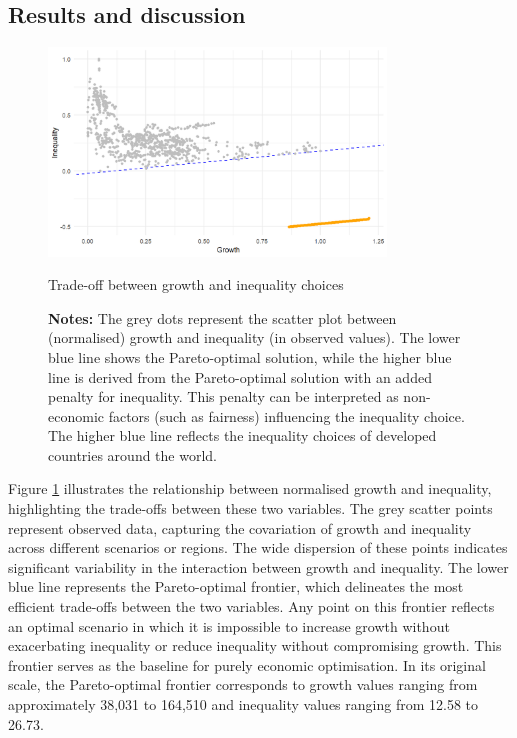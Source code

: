 \documentclass[12pt]{article}
\begin{document}
\subsection{Results and discussion}
\begin{figure}[H]
    \centering
    \includegraphics[width=0.8\textwidth]{trade_off.png}
    \caption{Trade-off between growth and inequality choices}
    \captionsetup{font=footnotesize}
    \caption*{\textbf{Notes:} The grey dots represent the scatter plot between (normalised) growth and inequality (in observed values). The lower blue line shows the Pareto-optimal solution, while the higher blue line is derived from the Pareto-optimal solution with an added penalty for inequality. This penalty can be interpreted as non-economic factors (such as fairness) influencing the inequality choice. The higher blue line reflects the inequality choices of developed countries around the world.}
    \label{fig:trade_off}
\end{figure}

Figure \ref{fig:trade_off} illustrates the relationship between normalised growth and inequality, highlighting the trade-offs between these two variables. The grey scatter points represent observed data, capturing the covariation of growth and inequality across different scenarios or regions. The wide dispersion of these points indicates significant variability in the interaction between growth and inequality. The lower blue line represents the Pareto-optimal frontier, which delineates the most efficient trade-offs between the two variables. Any point on this frontier reflects an optimal scenario in which it is impossible to increase growth without exacerbating inequality or reduce inequality without compromising growth. This frontier serves as the baseline for purely economic optimisation. In its original scale, the Pareto-optimal frontier corresponds to growth values ranging from approximately 38,031 to 164,510 and inequality values ranging from 12.58 to 26.73. 
\end{document}
